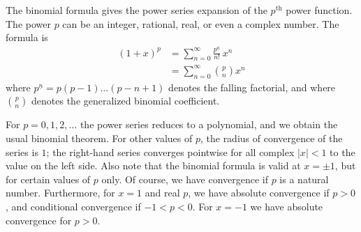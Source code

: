 \documentclass{article}
\newcommand{\supth}{^{\text{th}}}
\begin{document}
The binomial formula gives the power series expansion of the
$p\supth$ power function. The power $p$ can be an integer,
rational, real, or even a complex number.  The formula is
\begin{align*}
  (1+x)^p &= \sum_{n=0}^\infty  \frac{p^{\underline{n}}}{n!} \, x^n\\
          &=  \sum_{n=0}^\infty  \binom{p}{n} x^n
\end{align*}
where $p^{\underline{n}}= p(p-1)\ldots (p-n+1)$ denotes the falling
factorial, and where $\binom{p}{n}$ denotes the generalized binomial
coefficient.  

For $p=0,1,2,\ldots$ the power series reduces to a polynomial, and we
obtain the usual binomial theorem.  For other values of $p$, the
radius of convergence of the series is $1$; the right-hand series
converges pointwise for all complex $|x|<1$ to the value on the left
side.  Also note that the binomial formula is valid at $x=\pm 1$, but
for certain values of $p$ only.  Of course, we have convergence if $p$
is a natural number.  Furthermore, for $x=1$ and real $p$, we have
absolute convergence if $p>0$, and conditional convergence if
$-1<p<0$.  For $x=-1$ we have absolute convergence for $p>0$.
\end{document}
